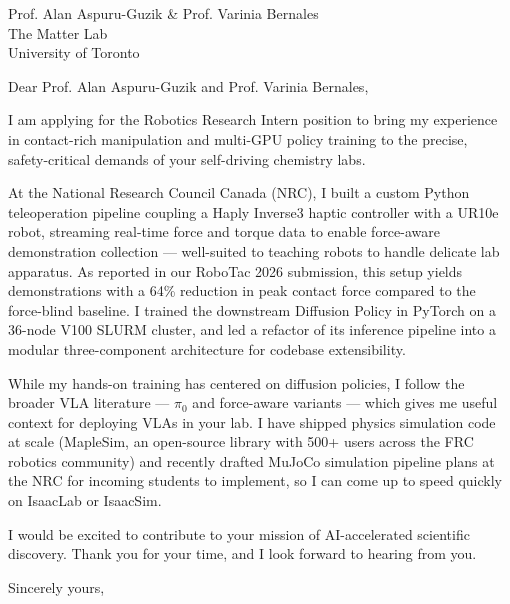 \documentclass[
	parskip=half, %
	enlargefirstpage=true, %
]{scrlttr2} %
\begin{document}

\begin{letter}{
	Prof. Alan Aspuru-Guzik \& Prof. Varinia Bernales \\
	The Matter Lab \\
	University of Toronto
}

\opening{Dear Prof. Alan Aspuru-Guzik and Prof. Varinia Bernales,}

I am applying for the Robotics Research Intern position to bring my experience in contact-rich manipulation and multi-GPU policy training to the precise, safety-critical demands of your self-driving chemistry labs.

At the National Research Council Canada (NRC), I built a custom Python teleoperation pipeline coupling a Haply Inverse3 haptic controller with a UR10e robot, streaming real-time force and torque data to enable force-aware demonstration collection --- well-suited to teaching robots to handle delicate lab apparatus. As reported in our RoboTac 2026 submission, this setup yields demonstrations with a 64\% reduction in peak contact force compared to the force-blind baseline. I trained the downstream Diffusion Policy in PyTorch on a 36-node V100 SLURM cluster, and led a refactor of its inference pipeline into a modular three-component architecture for codebase extensibility.

While my hands-on training has centered on diffusion policies, I follow the broader VLA literature --- $\pi_0$ and force-aware variants --- which gives me useful context for deploying VLAs in your lab. I have shipped physics simulation code at scale (MapleSim, an open-source library with 500+ users across the FRC robotics community) and recently drafted MuJoCo simulation pipeline plans at the NRC for incoming students to implement, so I can come up to speed quickly on IsaacLab or IsaacSim.

I would be excited to contribute to your mission of AI-accelerated scientific discovery. Thank you for your time, and I look forward to hearing from you.

Sincerely yours, \\


\end{letter}
\end{document}
